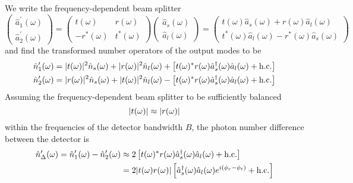 We write the frequency-dependent beam splitter \cite[p.~207]{Vogel2006}
\begin{equation}
	\begin{pmatrix}
		\hat{a}_1^\prime(\omega) \\
		\hat{a}_2^\prime(\omega)
	\end{pmatrix}
	=
	\begin{pmatrix}
		t(\omega) & r(\omega) \\
		-r^*(\omega) & t^*(\omega)
	\end{pmatrix}
	\begin{pmatrix}
		\hat{a}_s(\omega) \\
		\hat{a}_l(\omega)
	\end{pmatrix}
	=
	\begin{pmatrix}
		t(\omega)\hat{a}_s(\omega) + r(\omega)\hat{a}_l(\omega) \\
		t^*(\omega)\hat{a}_l(\omega) - r^*(\omega)\hat{a}_s(\omega)
	\end{pmatrix}
\end{equation}
and find the transformed number operators of the output modes to be
\begin{align}
	\hat{n}_1^\prime(\omega)
	&=
	\lvert t(\omega)\rvert^2
	\hat{n}_s(\omega)
	+
	\lvert r(\omega)\rvert^2
	\hat{n}_l(\omega)
	+
	\left[
		t(\omega)^*
		r(\omega)
		\hat{a}_s^\dagger(\omega)
		\hat{a}_l(\omega)
		+
		\text{h.c.}
	\right]
	\\
	\hat{n}_2^\prime(\omega)
	&=
	\lvert r(\omega)\rvert^2
	\hat{n}_s(\omega)
	+
	\lvert t(\omega)\rvert^2
	\hat{n}_l(\omega)
	-
	\left[
		t(\omega)^*
		r(\omega)
		\hat{a}_s^\dagger(\omega)
		\hat{a}_l(\omega)
		+
		\text{h.c.}
	\right]
\end{align}
Assuming the frequency-dependent beam splitter to be sufficiently balanced
\begin{equation}
	\lvert t(\omega)\rvert
	\approx
	\lvert r(\omega)\rvert
\end{equation}
within the frequencies of the detector bandwidth $B$, the photon number difference between the detector is
\begin{equation}
	\begin{split}
		\hat{n}^\prime_\Delta(\omega)
		=
		\hat{n}_1^\prime(\omega)
		-
		\hat{n}_2^\prime(\omega)
		&\approx
		2\left[
			t(\omega)^*
			r(\omega)
			\hat{a}_s^\dagger(\omega)
			\hat{a}_l(\omega)
			+
			\text{h.c.}
		\right]
		\\
		&=
		2\lvert t(\omega)r(\omega)\rvert
		\left[
			\hat{a}_s^\dagger(\omega)
			\hat{a}_l(\omega)
			e^{i(\phi_r-\phi_t)}
			+
			\text{h.c.}
		\right]
	\end{split}
\end{equation}
